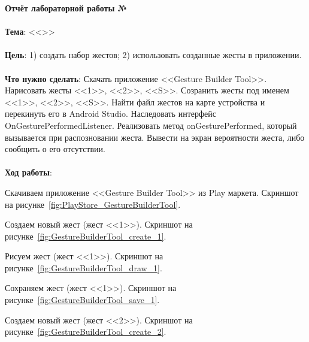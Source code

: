 \documentclass[12pt, a4paper, simple]{eskdtext}
\def \gpiDocTopic {Отчёт лабораторной работы №\gpiDocNum}
\begin{document}
    
    \thispagestyle{plain}
    \pagestyle{plain}

    \begin{center}
        \textbf{\gpiDocTopic}
    \end{center}

    \paragraph{} \textbf{Тема}: <<\gpiTopicRep>>

    \paragraph{} \textbf{Цель}: 1) создать набор жестов; 2) использовать созданные жесты в приложении.

    \paragraph{} \textbf{Что нужно сделать}:
    Скачать приложение <<Gesture Builder Tool>>.
    Нарисовать жесты <<1>>, <<2>>, <<S>>.
    Созранить жесты под именем <<1>>, <<2>>, <<S>>.
    Найти файл жестов на карте устройства и перекинуть его в Android Studio. 
    Наследовать интерфейс OnGesturePerformedListener.
    Реализовать метод onGesturePerformed, который вызывается при распозновании жеста.
    Вывести на экран вероятности жеста, либо сообщить о его отсутствии.

    \paragraph{} \textbf{Ход работы}:

    Скачиваем приложение <<Gesture Builder Tool>> из Play маркета.
    Скриншот на рисунке~\ref{fig:PlayStore_GestureBuilderTool}.

    Создаем новый жест (жест <<1>>). Скриншот на рисунке~\ref{fig:GestureBuilderTool_create_1}.

    Рисуем жест (жест <<1>>). Скриншот на рисунке~\ref{fig:GestureBuilderTool_draw_1}.

    Сохраняем жест (жест <<1>>). Скриншот на рисунке~\ref{fig:GestureBuilderTool_save_1}.

    Создаем новый жест (жест <<2>>). Скриншот на рисунке~\ref{fig:GestureBuilderTool_create_2}.
\end{document}
